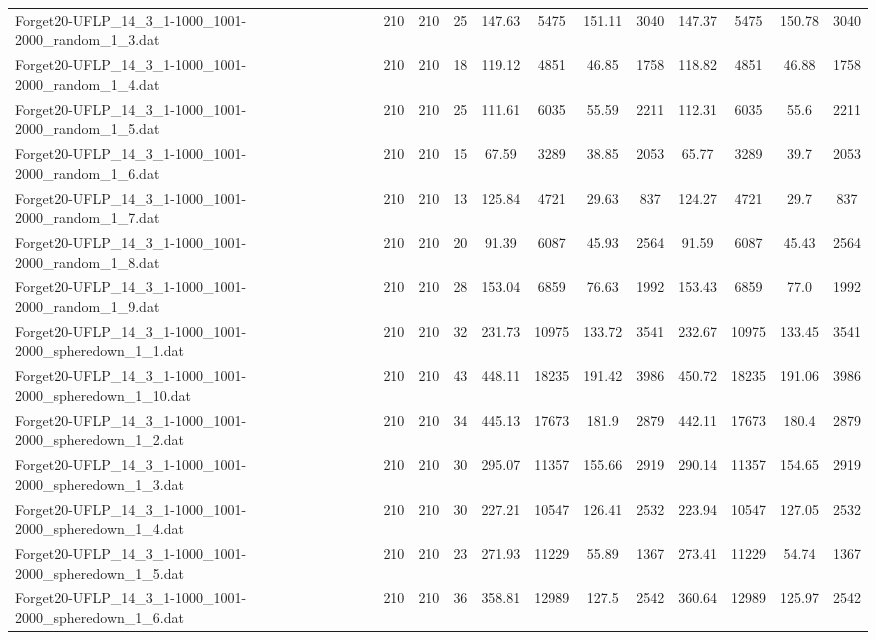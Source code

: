 \begin{sidewaystable}[!ht]
{\begin{tabular}{lccccccccccc}
Forget20-UFLP\_14\_3\_1-1000\_1001-2000\_random\_1\_3.dat & 210 & 210 & 25 & 147.63 & 5475 & 151.11 & 3040 &  \textcolor{blue2}{147.37} & 5475 & 150.78 & 3040 \\
Forget20-UFLP\_14\_3\_1-1000\_1001-2000\_random\_1\_4.dat & 210 & 210 & 18 & 119.12 & 4851 & 46.85 & 1758 & 118.82 & 4851 & 46.88 & 1758 \\
Forget20-UFLP\_14\_3\_1-1000\_1001-2000\_random\_1\_5.dat & 210 & 210 & 25 & 111.61 & 6035 & 55.59 & 2211 & 112.31 & 6035 & 55.6 & 2211 \\
Forget20-UFLP\_14\_3\_1-1000\_1001-2000\_random\_1\_6.dat & 210 & 210 & 15 & 67.59 & 3289 & 38.85 & 2053 & 65.77 & 3289 & 39.7 & 2053 \\
Forget20-UFLP\_14\_3\_1-1000\_1001-2000\_random\_1\_7.dat & 210 & 210 & 13 & 125.84 & 4721 &  \textcolor{blue2}{29.63} & 837 & 124.27 & 4721 & 29.7 & 837 \\
Forget20-UFLP\_14\_3\_1-1000\_1001-2000\_random\_1\_8.dat & 210 & 210 & 20 & 91.39 & 6087 & 45.93 & 2564 & 91.59 & 6087 & 45.43 & 2564 \\
Forget20-UFLP\_14\_3\_1-1000\_1001-2000\_random\_1\_9.dat & 210 & 210 & 28 & 153.04 & 6859 & 76.63 & 1992 & 153.43 & 6859 & 77.0 & 1992 \\
Forget20-UFLP\_14\_3\_1-1000\_1001-2000\_spheredown\_1\_1.dat & 210 & 210 & 32 & 231.73 & 10975 & 133.72 & 3541 & 232.67 & 10975 & 133.45 & 3541 \\
Forget20-UFLP\_14\_3\_1-1000\_1001-2000\_spheredown\_1\_10.dat & 210 & 210 & 43 & 448.11 & 18235 & 191.42 & 3986 & 450.72 & 18235 &  \textcolor{blue2}{191.06} & 3986 \\
Forget20-UFLP\_14\_3\_1-1000\_1001-2000\_spheredown\_1\_2.dat & 210 & 210 & 34 & 445.13 & 17673 & 181.9 & 2879 & 442.11 & 17673 &  \textcolor{blue2}{180.4} & 2879 \\
Forget20-UFLP\_14\_3\_1-1000\_1001-2000\_spheredown\_1\_3.dat & 210 & 210 & 30 & 295.07 & 11357 & 155.66 & 2919 & 290.14 & 11357 &  \textcolor{blue2}{154.65} & 2919 \\
Forget20-UFLP\_14\_3\_1-1000\_1001-2000\_spheredown\_1\_4.dat & 210 & 210 & 30 & 227.21 & 10547 & 126.41 & 2532 & 223.94 & 10547 & 127.05 & 2532 \\
Forget20-UFLP\_14\_3\_1-1000\_1001-2000\_spheredown\_1\_5.dat & 210 & 210 & 23 & 271.93 & 11229 & 55.89 & 1367 & 273.41 & 11229 &  \textcolor{blue2}{54.74} & 1367 \\
Forget20-UFLP\_14\_3\_1-1000\_1001-2000\_spheredown\_1\_6.dat & 210 & 210 & 36 & 358.81 & 12989 & 127.5 & 2542 & 360.64 & 12989 & 125.97 & 2542 \\

\end{tabular}}
\end{sidewaystable}
